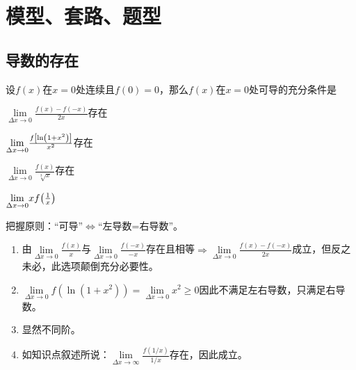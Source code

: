 \section{模型、套路、题型}\label{sec:1.3}
\subsection{导数的存在}\label{sec:1.3.1}

\begin{problem}
	设$f(x)$在$x=0$处连续且$f(0)=0$，那么$f(x)$在$x=0$处可导的充分条件是\xparen
	\begin{xchoices}[showanswer = true]
		\item $\underset{\Delta x\rightarrow 0}{\lim}\frac{f(x)-f(-x)}{2x}$存在
		\item $\underset{\Delta x\rightarrow 0}{\lim}\frac{f\qty[\ln(1+x^2)]}{x^2}$存在
		\item $\underset{\Delta x\rightarrow 0}{\lim}\frac{f(x)}{\sqrt[3]{x}}$存在
		\item* $\underset{\Delta x\rightarrow 0}{\lim}xf\qty(\frac{1}{x})$
	\end{xchoices}
\vspace{0.5em}
\begin{solution}
	把握原则：“可导”$\Leftrightarrow$“左导数=右导数”。
	\begin{enumerate}[label=\Alph*.]
		\item 由$\underset{\Delta x\rightarrow 0}{\lim}\frac{f(x)}{x}$与$\underset{\Delta x\rightarrow 0}{\lim}\frac{f(-x)}{-x}$存在且相等$\Rightarrow\underset{\Delta x\rightarrow 0}{\lim}\frac{f(x)-f(-x)}{2x}$成立，但反之未必，此选项颠倒充分必要性。
		\item $\underset{\Delta x\rightarrow 0}{\lim} f(\ln(1+x^2))=\underset{\Delta x\rightarrow 0}{\lim}x^2\ge 0$因此不满足左右导数，只满足右导数。
		\item 显然不同阶。
		\item 如知识点叙述所说：$\underset{\Delta x\rightarrow \infty}{\lim}\frac{f(1/x)}{1/x}$存在，因此成立。
	\end{enumerate}
\end{solution}
\end{problem}
	
